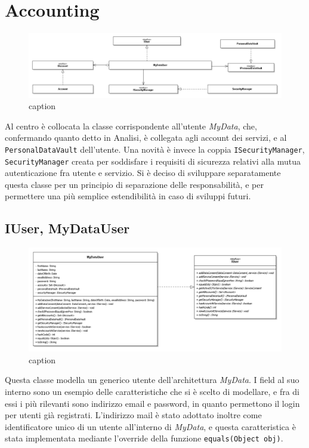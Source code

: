 \section{Accounting}
\begin{figure} [h]
	\includegraphics[width=\linewidth]{pictures/Accounting-closed.png}
	\caption{caption}
	\label{fig:Accounting-closed}
\end{figure}
Al centro \`e collocata la classe corrispondente all’utente \textit{MyData}, che, confermando quanto detto in Analisi, \`e collegata agli account dei servizi, e al \texttt{PersonalDataVault} dell’utente. Una novit\`a \`e invece la coppia \texttt{ISecurityManager}, \texttt{SecurityManager} creata per soddisfare i requisiti di sicurezza relativi alla mutua autenticazione fra utente e servizio. Si \`e deciso di sviluppare separatamente questa classe per un principio di separazione delle responsabilit\`a, e per permettere una pi\`u semplice estendibilit\`a in caso di sviluppi futuri.

\subsection{IUser, MyDataUser}
\begin{figure} [h]
	\includegraphics[width=\linewidth]{pictures/Accounting-MyDataUsr.png}
	\caption{caption}
	\label{fig:Accounting-MyDatUsr}
\end{figure}
Questa classe modella un generico utente dell’architettura \textit{MyData}. I field al suo interno sono un esempio delle caratteristiche che si \`e scelto di modellare, e fra di essi i pi\`u rilevanti sono indirizzo email e password, in quanto permettono il login per utenti gi\`a registrati. L’indirizzo mail \`e stato adottato inoltre come identificatore unico di un utente all’interno di \textit{MyData}, e questa caratteristica \`e stata implementata mediante l’override della funzione \texttt{equals(Object obj)}.

